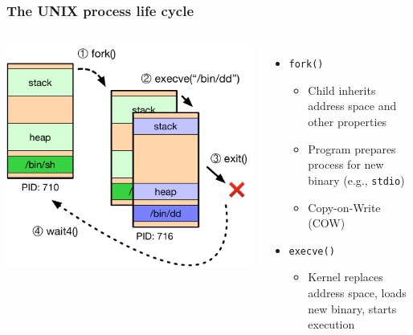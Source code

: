 \begin{frame}
  \frametitle{The UNIX process life cycle}

  \begin{columns}[T]
      \vspace{0.5cm}
      \includegraphics[width=\textwidth]{../../figures/process-life-cycle.pdf}

    \begin{itemize}

      \pause

      \item \texttt{fork()}
      \begin{itemize}
	\item Child inherits address space and other properties
	\item Program prepares process for new binary (e.g., \texttt{stdio})
	\item Copy-on-Write (COW)
      \end{itemize}

      \pause

      \item \texttt{execve()}
      \begin{itemize}
	\item Kernel replaces address space, loads new binary, starts execution
      \end{itemize}


\end{itemize}
\end{columns}
\end{frame}
